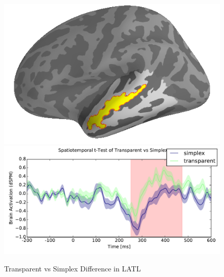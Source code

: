 \documentclass{frontiersSCNS}
\begin{document}
\begin{figure}
\begin{centering}
\includegraphics[scale=0.50]{images/transparent_prime_brain_analysis}\includegraphics[scale=0.50]{images/transparent_prime_analysis}
\par\end{centering}
\caption{\label{fig:transparent_primes} Transparent vs Simplex Difference in LATL}
\end{figure}
\end{document}
